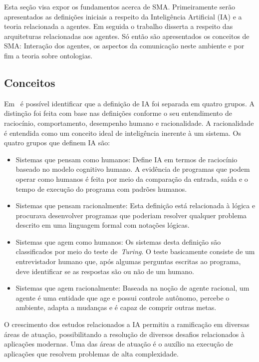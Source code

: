 Esta seção visa expor os fundamentos acerca de SMA. Primeiramente serão apresentados as definições iniciais a respeito da Inteligência Artificial (IA) e a teoria relacionada a agentes. Em seguida o trabalho disserta a respeito das arquiteturas relacionadas aos agentes. Só então são apresentados os conceitos de SMA: Interação dos agentes, os aspectos da comunicação neste ambiente e por fim a teoria sobre ontologias.

\subsection{Conceitos}

Em~\cite{novig95} é possível identificar que a definição de IA foi separada em quatro grupos. A distinção foi feita com base nas definições conforme o seu entendimento de raciocínio, comportamento, desempenho humano e racionalidade. A racionalidade é entendida como um conceito ideal de inteligência inerente à um sistema. Os quatro grupos que definem IA são:

\begin{itemize}
	\item Sistemas que pensam como humanos: Define IA em termos de raciocínio baseado no modelo cognitivo humano. A evidência de programas que podem operar como humanos é feita por meio da comparação da entrada, saída e o tempo de execução do programa com padrões humanos.
	\item Sistemas que pensam racionalmente: Esta definição está relacionada à lógica e procurava desenvolver programas que poderiam resolver qualquer problema descrito em uma linguagem formal com notações lógicas.
	\item Sistemas que agem como humanos: Os sistemas desta definição são classificados por meio do teste de~\emph{Turing}. O teste basicamente consiste de um entrevistador humano que, após algumas perguntas escritas ao programa, deve identificar se as respostas são ou não de um humano.
	\item Sistemas que agem racionalmente: Baseada na noção de agente racional, um agente é uma entidade que age e possui controle autônomo, percebe o ambiente, adapta a mudanças e é capaz de comprir outras metas.
\end{itemize}

O crescimento dos estudos relacionados a IA permitiu a ramificação em diversas áreas de atuação, possibilitando a resolução de diversos desafios relacionados à aplicações modernas. Uma das áreas de atuação é o auxílio na execução de aplicações que resolvem problemas de alta complexidade. 


